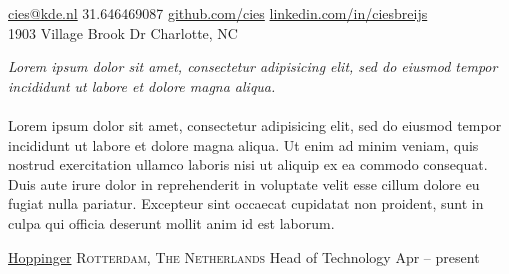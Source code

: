 \documentclass[10pt,a4paper]{article}
\begin{document}
\sloppy  %



\nobreakvspace{0.3em}  %

\noindent\href{mailto:cies.at.kde.dot.nl}{cies\mbox{}@\mbox{}kde.nl}\sbull
\textsmaller{+}31.646469087\sbull
\href{https://github.com/cies}{github.com/cies}\sbull
\href{http://linkedin.com/in/ciesbreijs}{linkedin.com/in/ciesbreijs}
\\
1903 Village Brook Dr\sbull
Charlotte, NC

\spacedhrule{0.9em}{-0.4em}  %


\vspace{-1.3em}  %
\begin{multicols}{2}  %
\noindent \emph{Lorem ipsum dolor sit amet, consectetur adipisicing elit, sed do eiusmod tempor incididunt ut labore et dolore magna aliqua.}
\\
\\
Lorem ipsum dolor sit amet, consectetur adipisicing elit, sed do eiusmod tempor incididunt ut labore et dolore magna aliqua. Ut enim ad minim veniam, quis nostrud exercitation ullamco laboris nisi ut aliquip ex ea commodo consequat. Duis aute irure dolor in reprehenderit in voluptate velit esse cillum dolore eu fugiat nulla pariatur. Excepteur sint occaecat cupidatat non proident, sunt in culpa qui officia deserunt mollit anim id est laborum.
\end{multicols}


\spacedhrule{0em}{-0.4em}


\headedsection
  {\href{http://www.hoppinger.com}{Hoppinger}}
  {\textsc{Rotterdam, The Netherlands}} {%
  \headedsubsection
    {Head of Technology}
    {Apr  -- present}
    {}
}
\end{document}
